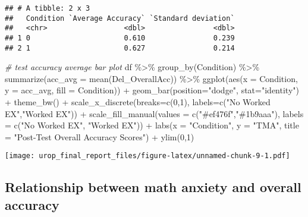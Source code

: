 \documentclass[
]{article}
\newenvironment{Shaded}{\begin{snugshade}}{\end{snugshade}}
\newcommand{\AttributeTok}[1]{\textcolor[rgb]{0.77,0.63,0.00}{#1}}
\newcommand{\CommentTok}[1]{\textcolor[rgb]{0.56,0.35,0.01}{\textit{#1}}}
\newcommand{\DecValTok}[1]{\textcolor[rgb]{0.00,0.00,0.81}{#1}}
\newcommand{\FunctionTok}[1]{\textcolor[rgb]{0.00,0.00,0.00}{#1}}
\newcommand{\NormalTok}[1]{#1}
\newcommand{\SpecialCharTok}[1]{\textcolor[rgb]{0.00,0.00,0.00}{#1}}
\newcommand{\StringTok}[1]{\textcolor[rgb]{0.31,0.60,0.02}{#1}}
\begin{document}
\begin{verbatim}
## # A tibble: 2 x 3
##   Condition `Average Accuracy` `Standard deviation`
##   <chr>                  <dbl>                <dbl>
## 1 0                      0.610                0.239
## 2 1                      0.627                0.214
\end{verbatim}

\begin{Shaded}
\begin{Highlighting}[]
\CommentTok{\# test accuracy average bar plot}
\NormalTok{df }\SpecialCharTok{\%\textgreater{}\%} 
  \FunctionTok{group\_by}\NormalTok{(Condition) }\SpecialCharTok{\%\textgreater{}\%} 
  \FunctionTok{summarize}\NormalTok{(}\AttributeTok{acc\_avg =} \FunctionTok{mean}\NormalTok{(Del\_OverallAcc))  }\SpecialCharTok{\%\textgreater{}\%} 
  \FunctionTok{ggplot}\NormalTok{(}\FunctionTok{aes}\NormalTok{(}\AttributeTok{x =}\NormalTok{ Condition, }\AttributeTok{y =}\NormalTok{ acc\_avg, }\AttributeTok{fill =}\NormalTok{ Condition)) }\SpecialCharTok{+}
  \FunctionTok{geom\_bar}\NormalTok{(}\AttributeTok{position=}\StringTok{"dodge"}\NormalTok{, }\AttributeTok{stat=}\StringTok{"identity"}\NormalTok{) }\SpecialCharTok{+} \FunctionTok{theme\_bw}\NormalTok{() }\SpecialCharTok{+} 
  \FunctionTok{scale\_x\_discrete}\NormalTok{(}\AttributeTok{breaks=}\FunctionTok{c}\NormalTok{(}\DecValTok{0}\NormalTok{,}\DecValTok{1}\NormalTok{),}
        \AttributeTok{labels=}\FunctionTok{c}\NormalTok{(}\StringTok{"No Worked EX"}\NormalTok{,}\StringTok{"Worked EX"}\NormalTok{)) }\SpecialCharTok{+}
  \FunctionTok{scale\_fill\_manual}\NormalTok{(}\AttributeTok{values =} \FunctionTok{c}\NormalTok{(}\StringTok{"\#ef476f"}\NormalTok{,}\StringTok{"\#1b9aaa"}\NormalTok{), }\AttributeTok{labels =} 
                                  \FunctionTok{c}\NormalTok{(}\StringTok{"No Worked EX"}\NormalTok{, }\StringTok{"Worked EX"}\NormalTok{)) }\SpecialCharTok{+}
  \FunctionTok{labs}\NormalTok{(}\AttributeTok{x =} \StringTok{"Condition"}\NormalTok{, }\AttributeTok{y =} \StringTok{"TMA"}\NormalTok{, }\AttributeTok{title =} \StringTok{"Post{-}Test Overall Accuracy Scores"}\NormalTok{) }\SpecialCharTok{+} \FunctionTok{ylim}\NormalTok{(}\DecValTok{0}\NormalTok{,}\DecValTok{1}\NormalTok{)}
\end{Highlighting}
\end{Shaded}

\texttt{[image: urop\_final\_report\_files/figure-latex/unnamed-chunk-9-1.pdf]}

\hypertarget{relationship-between-math-anxiety-and-overall-accuracy}{%
\subsection{Relationship between math anxiety and overall
accuracy}\label{relationship-between-math-anxiety-and-overall-accuracy}}
\end{document}
